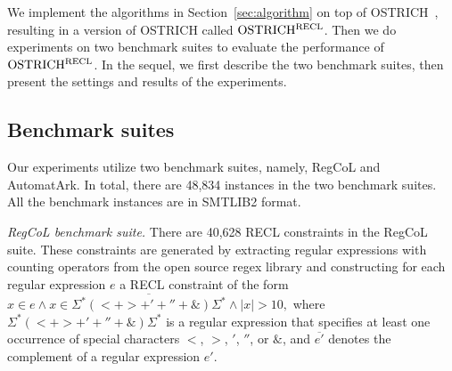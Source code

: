 %

We implement the algorithms in Section~\ref{sec:algorithm} on top of OSTRICH~\cite{Ostrich,atva2020}, resulting in a version of OSTRICH called $\rm OSTRICH^{RECL}$.
Then we do experiments on two benchmark suites to evaluate the performance of $\rm OSTRICH^{RECL}$. In the sequel, we first describe the two benchmark suites, then present the settings and results of the experiments. 


\vspace{-2mm}
\subsection{Benchmark suites}\label{sec:bench}

Our experiments utilize two benchmark suites, namely, RegCoL and AutomatArk. In total, there are 48,834 instances in the two benchmark suites. All the benchmark instances are in SMTLIB2 format. 

\medskip
\noindent
\emph{RegCoL benchmark suite.} There are 40,628 RECL constraints in the RegCoL suite. These constraints are generated by extracting regular expressions with counting operators from the open source regex library \cite{regex_lingua_franca,redos_lenka} and constructing for each regular expression $e$ a RECL constraint of the form 
$x \in e \wedge x \in \overline{\Sigma^*(<+ >+'+''+\&)\Sigma^*} \wedge |x| > 10,$   
where $\Sigma^*(<+ >+'+''+\&)\Sigma^*$ is a regular expression that specifies at least one occurrence of special characters $<$, $>$, $'$, $''$, or $\&$, and $\overline{e'}$ denotes the complement of a regular expression $e'$. 

